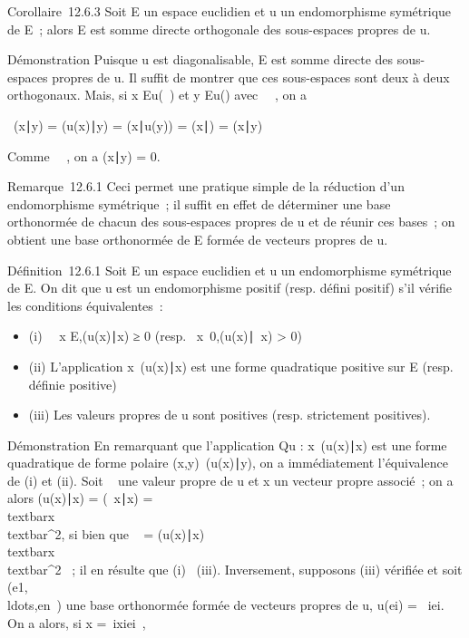 Corollaire~12.6.3 Soit E un espace euclidien et u un endomorphisme
symétrique de E~; alors E est somme directe orthogonale des sous-espaces
propres de u.

Démonstration Puisque u est diagonalisable, E est somme directe des
sous-espaces propres de u. Il suffit de montrer que ces sous-espaces
sont deux à deux orthogonaux. Mais, si x \in Eu(\lambda~) et y \in
Eu(\mu) avec \lambda~\neq~\mu, on a

\lambda~(x∣y) = (u(x)\mathrel∣y)
= (x∣u(y)) =
(x∣\muy) = \mu(x\mathrel∣y)

Comme \lambda~\neq~\mu, on a
(x∣y) = 0.

Remarque~12.6.1 Ceci permet une pratique simple de la réduction d'un
endomorphisme symétrique~; il suffit en effet de déterminer une base
orthonormée de chacun des sous-espaces propres de u et de réunir ces
bases~; on obtient une base orthonormée de E formée de vecteurs propres
de u.

Définition~12.6.1 Soit E un espace euclidien et u un endomorphisme
symétrique de E. On dit que u est un endomorphisme positif (resp. défini
positif) s'il vérifie les conditions équivalentes~:

\begin{itemize}
\itemsep1pt\parskip0pt
\item
  (i) \forall~~x \in
  E,(u(x)∣x) ≥ 0 (resp.
  \forall~x\neq~0,(u(x)\mathrel∣~x)
  \textgreater{} 0)
\item
  (ii) L'application
  x\mapsto~(u(x)\mathrel∣x) est
  une forme quadratique positive sur E (resp. définie positive)
\item
  (iii) Les valeurs propres de u sont positives (resp. strictement
  positives).
\end{itemize}

Démonstration En remarquant que l'application Qu :
x\mapsto~(u(x)\mathrel∣x) est une
forme quadratique de forme polaire
(x,y)\mapsto~(u(x)\mathrel∣y), on
a immédiatement l'équivalence de (i) et (ii). Soit \lambda~ une valeur propre
de u et x un vecteur propre associé~; on a alors
(u(x)∣x) = (\lambda~x\mathrel∣x)
= \lambda~\\textbar{}x\\textbar{}^2,
si bien que \lambda~ = (u(x)∣x)
\over
\\textbar{}x\\textbar{}^2 ~;
il en résulte que (i) \rigtharrow~(iii). Inversement, supposons (iii) vérifiée et
soit
(e1,\\ldots,en~)
une base orthonormée formée de vecteurs propres de u, u(ei) =
\lambda~iei. On a alors, si x =\
\sum  ixiei~,

